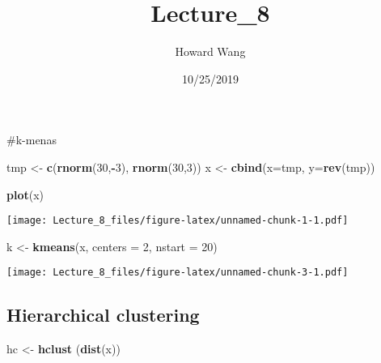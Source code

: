 \documentclass[]{article}
\title{Lecture\_8}
\author{Howard Wang}
\date{10/25/2019}
\newenvironment{Shaded}{\begin{snugshade}}{\end{snugshade}}
\newcommand{\DataTypeTok}[1]{\textcolor[rgb]{0.13,0.29,0.53}{#1}}
\newcommand{\DecValTok}[1]{\textcolor[rgb]{0.00,0.00,0.81}{#1}}
\newcommand{\KeywordTok}[1]{\textcolor[rgb]{0.13,0.29,0.53}{\textbf{#1}}}
\newcommand{\NormalTok}[1]{#1}
\newcommand{\OperatorTok}[1]{\textcolor[rgb]{0.81,0.36,0.00}{\textbf{#1}}}
\newcommand{\StringTok}[1]{\textcolor[rgb]{0.31,0.60,0.02}{#1}}
\begin{document}
\maketitle

\#k-menas

\begin{Shaded}
\begin{Highlighting}[]
\NormalTok{tmp <-}\StringTok{ }\KeywordTok{c}\NormalTok{(}\KeywordTok{rnorm}\NormalTok{(}\DecValTok{30}\NormalTok{,}\OperatorTok{-}\DecValTok{3}\NormalTok{), }\KeywordTok{rnorm}\NormalTok{(}\DecValTok{30}\NormalTok{,}\DecValTok{3}\NormalTok{)) }
\NormalTok{x <-}\StringTok{ }\KeywordTok{cbind}\NormalTok{(}\DataTypeTok{x=}\NormalTok{tmp, }\DataTypeTok{y=}\KeywordTok{rev}\NormalTok{(tmp))}

\KeywordTok{plot}\NormalTok{(x)}
\end{Highlighting}
\end{Shaded}

\texttt{[image: Lecture\_8\_files/figure-latex/unnamed-chunk-1-1.pdf]}

\begin{Shaded}
\begin{Highlighting}[]
\NormalTok{k <-}\StringTok{ }\KeywordTok{kmeans}\NormalTok{(x, }\DataTypeTok{centers =} \DecValTok{2}\NormalTok{, }\DataTypeTok{nstart =} \DecValTok{20}\NormalTok{)}
\end{Highlighting}
\end{Shaded}

\begin{Shaded}
\end{Shaded}

\texttt{[image: Lecture\_8\_files/figure-latex/unnamed-chunk-3-1.pdf]}

\hypertarget{hierarchical-clustering}{%
\subsection{Hierarchical clustering}\label{hierarchical-clustering}}

\begin{Shaded}
\begin{Highlighting}[]
\NormalTok{hc <-}\StringTok{ }\KeywordTok{hclust}\NormalTok{ (}\KeywordTok{dist}\NormalTok{(x))}
\end{Highlighting}
\end{Shaded}
\end{document}
